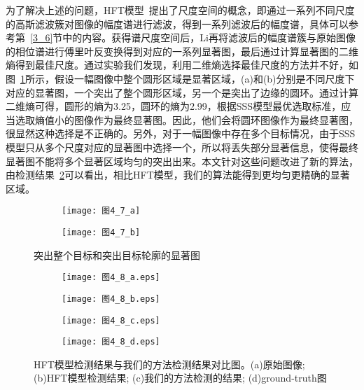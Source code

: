 为了解决上述的问题，HFT模型~\cite{LiJianTPAMI2013Scale}提出了尺度空间的概念，即通过一系列不同尺度的高斯滤波簇对图像的幅度谱进行滤波，得到一系列滤波后的幅度谱，具体可以参考第~\ref{3_6}节中的内容。获得谱尺度空间后，Li再将滤波后的幅度谱簇与原始图像的相位谱进行傅里叶反变换得到对应的一系列显著图，最后通过计算显著图的二维熵得到最佳尺度。通过实验我们发现，利用二维熵选择最佳尺度的方法并不好，如图~\ref{图4_7}所示，假设一幅图像中整个圆形区域是显著区域，(a)和(b)分别是不同尺度下对应的显著图，一个突出了整个圆形区域，另一个是突出了边缘的圆环。通过计算二维熵可得，圆形的熵为3.25，圆环的熵为2.99，根据SSS模型最优选取标准，应当选取熵值小的图像作为最终显著图。因此，他们会将圆环图像作为最终显著图，很显然这种选择是不正确的。另外，对于一幅图像中存在多个目标情况，由于SSS模型只从多个尺度对应的显著图中选择一个，所以将丢失部分显著信息，使得最终显著图不能将多个显著区域均匀的突出出来。本文针对这些问题改进了新的算法，由检测结果~\ref{图4_8}可以看出，相比HFT模型，我们的算法能得到更均匀更精确的显著区域。
\begin{figure}[t]
  \centering%
  \begin{subfigure}{0.39\textwidth}
    \texttt{[image: 图4\_7\_a]}
    \caption{}
  \end{subfigure}
  \hspace{4em}%
  \begin{subfigure}{0.4\textwidth}
    \texttt{[image: 图4\_7\_b]}
    \caption{}
  \end{subfigure}
  \caption{突出整个目标和突出目标轮廓的显著图}
  \label{图4_7}
\end{figure}
\begin{figure}[b]
  \centering%
  \begin{subfigure}{4cm}
    \texttt{[image: 图4\_8\_a.eps]}
    \caption{}
  \end{subfigure}
  \hspace{4em}%
  \begin{subfigure}{0.25\textwidth}
    \texttt{[image: 图4\_8\_b.eps]}
    \caption{}
  \end{subfigure}
  \hspace{4em}%
  \begin{subfigure}{0.25\textwidth}
    \texttt{[image: 图4\_8\_c.eps]}
    \caption{}
  \end{subfigure}
  \hspace{4em}%
  \begin{subfigure}{0.25\textwidth}
    \texttt{[image: 图4\_8\_d.eps]}
    \caption{}
  \end{subfigure}
  \caption{HFT模型检测结果与我们的方法检测结果对比图。(a)原始图像; (b)HFT模型检测结果; (c)我们的方法检测的结果; (d)ground-truth图}
  \label{图4_8}
\end{figure}

